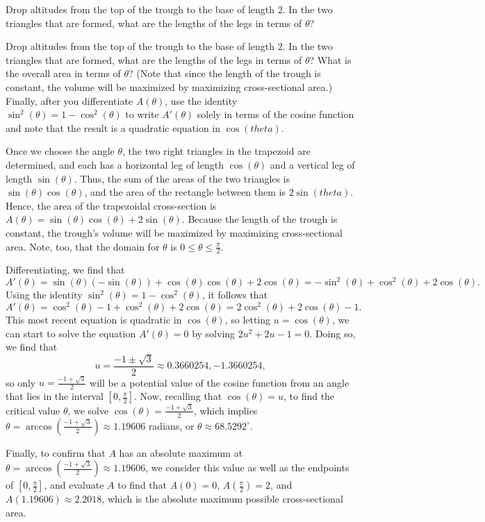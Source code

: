 \begin{smallhint}
Drop altitudes from the top of the trough to the base of length 2.  In the two triangles that are formed, what are the lengths of the legs in terms of $\theta$?
\end{smallhint}
\begin{bighint}
Drop altitudes from the top of the trough to the base of length 2.  In the two triangles that are formed, what are the lengths of the legs in terms of $\theta$?  What is the overall area in terms of $\theta$?  (Note that since the length of the trough is constant, the volume will be maximized by maximizing cross-sectional area.)  Finally, after you differentiate $A(\theta)$, use the identity $\sin^2(\theta) = 1 - \cos^2(\theta)$ to write $A'(\theta)$ solely in terms of the cosine function and note that the result is a quadratic equation in $\cos(theta)$.
\end{bighint}
\begin{activitySolution}
Once we choose the angle $\theta$, the two right triangles in the trapezoid are determined, and each has a horizontal leg of length $\cos(\theta)$ and a vertical leg of length $\sin(\theta)$.  Thus, the sum of the areas of the two triangles is $\sin(\theta) \cos(\theta)$, and the area of the rectangle between them is $2\sin(theta)$.  Hence, the area of the trapezoidal cross-section is $A(\theta) = \sin(\theta) \cos(\theta) + 2 \sin(\theta)$.  Because the length of the trough is constant, the trough's volume will be maximized by maximizing cross-sectional area.  Note, too, that the domain for $\theta$ is $0 \le \theta \le \frac{\pi}{2}$.

Differentiating, we find that
$$A'(\theta) = \sin(\theta) (-\sin(\theta)) + \cos(\theta) \cos(\theta) + 2 \cos(\theta) = -\sin^2(\theta) + \cos^2(\theta) + 2 \cos(\theta).$$
Using the identity $\sin^2(\theta) = 1 - \cos^2(\theta)$, it follows that
$$A'(\theta) = \cos^2(\theta) - 1 + \cos^2(\theta) + 2 \cos(\theta) = 2\cos^2(\theta) + 2 \cos(\theta) - 1.$$
This most recent equation is quadratic in $\cos(\theta)$, so letting $u = \cos(\theta)$, we can start to solve the equation $A'(\theta) = 0$ by solving $2u^2 + 2u - 1 = 0$.  Doing so, we find that 
$$u = \frac{-1 \pm \sqrt{3}}{2} \approx 0.3660254, -1.3660254,$$
so only $u = \frac{-1 + \sqrt{3}}{2}$ will be a potential value of the cosine function from an angle that lies in the interval $[0,\frac{\pi}{2}]$.  Now, recalling that $\cos(\theta) = u$, to find the critical value $\theta$, we solve $\cos(\theta) = \frac{-1 + \sqrt{3}}{2}$, which implies $\theta = \arccos(\frac{-1 + \sqrt{3}}{2}) \approx 1.19606$ radians, or $\theta \approx 68.5292^\circ$.

Finally, to confirm that $A$ has an absolute maximum at $\theta = \arccos(\frac{-1 + \sqrt{3}}{2}) \approx 1.19606$, we consider this value as well as the endpoints of $[0, \frac{\pi}{2}]$, and evaluate $A$ to find that $A(0) = 0$, $A(\frac{\pi}{2}) = 2$, and $A(1.19606) \approx 2.2018$, which is the absolute maximum possible cross-sectional area.
\end{activitySolution}
\aftera